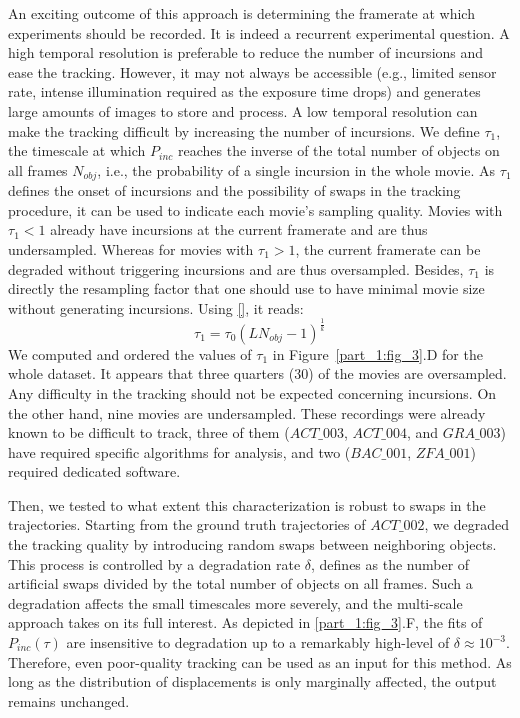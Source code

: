     An exciting outcome of this approach is determining the framerate at which experiments should be recorded. It is indeed a recurrent experimental question. A high temporal resolution is preferable to reduce the number of incursions and ease the tracking. However, it may not always be accessible (e.g., limited sensor rate, intense illumination required as the exposure time drops) and generates large amounts of images to store and process. A low temporal resolution can make the tracking difficult by increasing the number of incursions.
    We define $\tau_1$, the timescale at which $P_{inc}$ reaches the inverse of the total number of objects on all frames $N_{obj}$, i.e., the probability of a single incursion in the whole movie. As $\tau_1$ defines the onset of incursions and the possibility of swaps in the tracking procedure, it can be used to indicate each movie's sampling quality. Movies with $\tau_1<1$ already have incursions at the current framerate and are thus undersampled. Whereas for movies with $\tau_1>1$, the current framerate can be degraded without triggering incursions and are thus oversampled. Besides, $\tau_1$ is directly the resampling factor that one should use to have minimal movie size without generating incursions. Using \ref{}, it reads:
    $$\tau_1=\tau_0(LN_{obj}-1)^{\frac{1}{k}}$$
    We computed and ordered the values of $\tau_1$ in Figure~\ref{part_1:fig_3}.D for the whole dataset. It appears that three quarters (30) of the movies are oversampled. Any difficulty in the tracking should not be expected concerning incursions. On the other hand, nine movies are undersampled. These recordings were already known to be difficult to track, three of them ($ACT\_003$, $ACT\_004$, and $GRA\_003$) have required specific algorithms for analysis, and two ($BAC\_001$, $ZFA\_001$) required dedicated software.

    Then, we tested to what extent this characterization is robust to swaps in the trajectories. Starting from the ground truth trajectories of $ACT\_002$, we degraded the tracking quality by introducing random swaps between neighboring objects. This process is controlled by a degradation rate $\delta$, defines as the number of artificial swaps divided by the total number of objects on all frames. Such a degradation affects the small timescales more severely, and the multi-scale approach takes on its full interest. As depicted in \ref{part_1:fig_3}.F, the fits of $P_{inc}(\tau)$ are insensitive to degradation up to a remarkably high-level of $\delta \approx 10^{-3}$. Therefore, even poor-quality tracking can be used as an input for this method. As long as the distribution of displacements is only marginally affected, the output remains unchanged.


